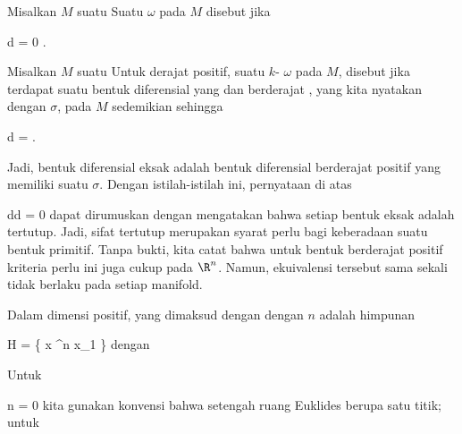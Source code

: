 {}
{

Misalkan $M$ suatu
Suatu
$\omega$ pada $M$ disebut  jika

\mavergleichskette
{\vergleichskette
{ d \omega
}
{ = }{ 0
}
{  }{
}
{    }{
}
{   }{
}
}
{}{}{.}

}

{}
{

Misalkan $M$ suatu
Untuk derajat positif, suatu
$k$-
$\omega$ pada $M$, disebut  jika terdapat suatu bentuk diferensial yang
dan berderajat , yang kita nyatakan dengan $\sigma$, pada $M$ sedemikian sehingga

\mavergleichskette
{\vergleichskette
{ d \sigma
}
{ = }{ \omega
}
{  }{
}
{    }{
}
{   }{
}
}
{}{}{.}

}

Jadi, bentuk diferensial eksak adalah bentuk diferensial berderajat positif yang memiliki suatu  {} $\sigma$. Dengan istilah-istilah ini, pernyataan di atas

\mavergleichskette
{\vergleichskette
{ dd
}
{ = }{ 0
}
{  }{
}
{    }{
}
{   }{
}
}
{}{}{}
dapat dirumuskan dengan mengatakan bahwa setiap bentuk eksak adalah tertutup. Jadi, sifat tertutup merupakan syarat perlu bagi keberadaan suatu bentuk primitif. Tanpa bukti, kita catat bahwa untuk bentuk berderajat positif kriteria perlu ini juga cukup pada $\R^n$. Namun, ekuivalensi tersebut sama sekali tidak berlaku pada setiap manifold.


{}
{

Dalam dimensi positif, yang dimaksud dengan  dengan
 $n$ adalah himpunan

\mavergleichskettedisp
{\vergleichskette
{H
}
{ =} { \left\{  x \in \R^n   \mid   x_1         \right\}
}
{ } {
}
{ } {
}
{ } {
}
}
{}{}{}
dengan

}
Untuk

\mavergleichskette
{\vergleichskette
{ n
}
{ = }{ 0
}
{  }{
}
{    }{
}
{   }{
}
}
{}{}{}
kita gunakan konvensi bahwa setengah ruang Euklides berupa satu titik; untuk

